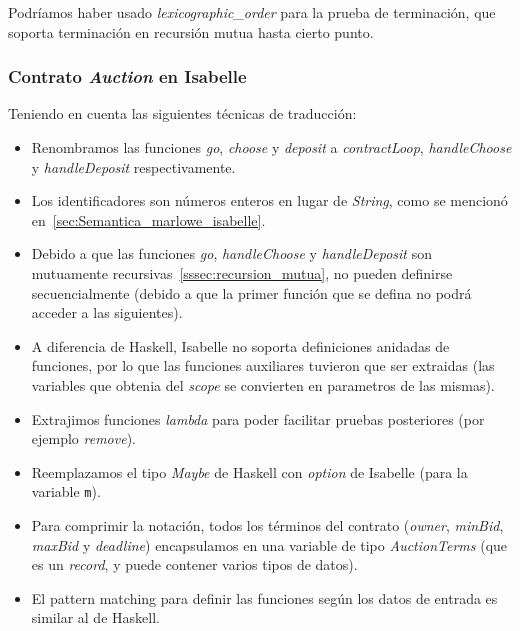 \documentclass[12pt]{book}
\begin{document}
Podríamos haber usado \textit{lexicographic\_order} para la prueba de terminación, que soporta terminación en recursión mutua hasta cierto punto. 


\subsubsection{Contrato \textit{Auction} en Isabelle}

Teniendo en cuenta las siguientes técnicas de traducción:

\begin{itemize}
    \item Renombramos las funciones \textit{go}, \textit{choose} y \textit{deposit} a \textit{contractLoop}, \textit{handleChoose} y \textit{handleDeposit} respectivamente.

    \item Los identificadores son números enteros en lugar de \textit{String}, como se mencionó en~\ref{sec:Semantica_marlowe_isabelle}.

    \item Debido a que las funciones \textit{go}, \textit{handleChoose} y \textit{handleDeposit} son mutuamente recursivas~\ref{sssec:recursion_mutua}, no pueden definirse secuencialmente (debido a que la primer función que se defina no podrá acceder a las siguientes). 

    \item A diferencia de Haskell, Isabelle no soporta definiciones anidadas de funciones, por lo que las funciones auxiliares tuvieron que ser extraidas (las variables que obtenia del \textit{scope} se convierten en parametros de las mismas).

    \item Extrajimos funciones \textit{lambda} para poder facilitar pruebas posteriores (por ejemplo \textit{remove}).

    \item Reemplazamos el tipo \textit{Maybe} de Haskell con \textit{option} de Isabelle (para la variable \texttt{m}).
    \item Para comprimir la notación, todos los términos del contrato (\textit{owner}, \textit{minBid}, \textit{maxBid} y \textit{deadline}) encapsulamos en una variable de tipo \textit{AuctionTerms} (que es un \textit{record}, y puede contener varios tipos de datos).

    \item El pattern matching para definir las funciones según los datos de entrada es similar al de Haskell.
         
\end{itemize}
\end{document}
